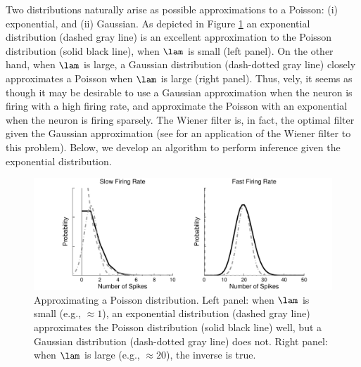 Two distributions naturally arise as possible approximations to a Poisson: (i) exponential, and (ii) Gaussian.  As depicted in Figure \ref{fig:dist_comp}  an exponential distribution (dashed gray line) is an excellent approximation to the Poisson distribution (solid black line), when $\lam$ is small (left panel).  On the other hand, when $\lam$ is large, a Gaussian distribution (dash-dotted gray line) closely approximates a Poisson when $\lam$ is large (right panel). Thus, \nai vely, it seems as though it may be desirable to use a Gaussian approximation when the neuron is firing with a high firing rate, and approximate the Poisson with an exponential when the neuron is firing sparsely.  The Wiener filter is, in fact, the optimal filter given the Gaussian approximation \cite{Wiener49} (see \cite{HolekampHoly08} for an application of the Wiener filter to this problem).  Below, we develop an algorithm to perform inference given the exponential distribution.  

\begin{figure}[H]
\centering \includegraphics[width=.9\linewidth]{../figs/dist_comp}
\caption{Approximating a Poisson distribution.  Left panel: when $\lam$ is small (e.g., $\approx 1$), an exponential distribution (dashed gray line) approximates the Poisson distribution (solid black line) well, but a Gaussian distribution (dash-dotted gray line) does not.  Right panel: when $\lam$ is large (e.g., $\approx 20$), the inverse is true.} \label{fig:dist_comp}
\end{figure}